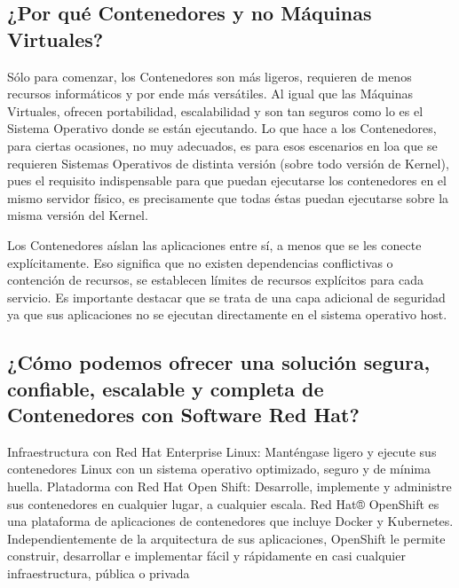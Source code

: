 \documentclass[preprint,12pt]{elsarticle}
\begin{document}
\subsection{\textbf{¿Por qué Contenedores y no Máquinas Virtuales?}}
Sólo para comenzar, los Contenedores son más ligeros, requieren de menos recursos informáticos y por ende más versátiles. Al igual que las Máquinas Virtuales, ofrecen portabilidad, escalabilidad y son tan seguros como lo es el Sistema Operativo donde se están ejecutando. Lo que hace a los Contenedores, para ciertas ocasiones, no muy adecuados, es para esos escenarios en loa que se requieren Sistemas Operativos de distinta versión (sobre todo versión de Kernel), pues el requisito indispensable para que puedan ejecutarse los contenedores en el mismo servidor físico, es precisamente que todas éstas puedan ejecutarse sobre la misma versión del Kernel.

Los Contenedores aíslan las aplicaciones entre sí, a menos que se les conecte explícitamente. Eso significa que no existen dependencias conflictivas o contención de recursos, se establecen límites de recursos explícitos para cada servicio. Es importante destacar que se trata de una capa adicional de seguridad ya que sus aplicaciones no se ejecutan directamente en el sistema operativo host.

\subsection{\textbf{¿Cómo podemos ofrecer una solución segura, confiable, escalable y completa de Contenedores con Software Red Hat?}}
Infraestructura con Red Hat Enterprise Linux: Manténgase ligero y ejecute sus contenedores Linux con un sistema operativo optimizado, seguro y de mínima huella. Platadorma con Red Hat Open Shift: Desarrolle, implemente y administre sus contenedores en cualquier lugar, a cualquier escala. Red Hat® OpenShift es una plataforma de aplicaciones de contenedores que incluye Docker y Kubernetes. Independientemente de la arquitectura de sus aplicaciones, OpenShift le permite construir, desarrollar e implementar fácil y rápidamente en casi cualquier infraestructura, pública o privada



\end{document}
